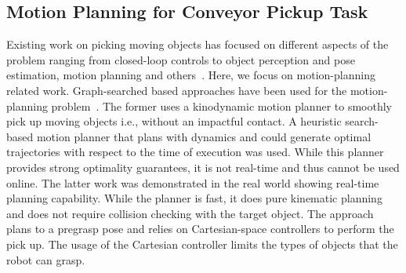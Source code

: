 \documentclass[a4paper,10pt]{article}
\begin{document}
\subsection{Motion Planning for Conveyor Pickup Task}
Existing work on picking moving objects has focused on different aspects of the problem ranging from closed-loop controls to object perception and pose estimation, motion planning and others~\cite{allen1993automated, han2019toward, stogl2017tracking, zhang2018gilbreth}. 
%
Here, we focus on motion-planning related work. Graph-searched based approaches have been used for the motion-planning problem~\cite{cowley2013perception, menon2014motion}. The former uses a kinodynamic motion planner to smoothly pick up moving objects i.e., without an impactful contact. A heuristic search-based motion planner that plans with dynamics and could generate optimal trajectories with respect to the time of execution was used. While this planner provides strong optimality guarantees, it is not real-time and thus cannot be used online.
%
The latter work was demonstrated in the real world showing real-time planning capability. While the planner is fast, it does  pure kinematic planning and does not require collision checking with the target object. The approach plans to a pregrasp pose and relies on Cartesian-space controllers to perform the pick up. The usage of the Cartesian controller limits the types of objects that the robot can grasp.
\end{document}
